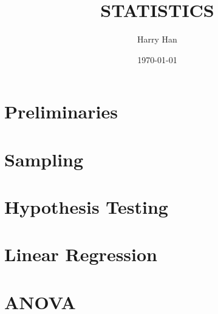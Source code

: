 \documentclass[12pt, a4paper]{report}
\title{
	STATISTICS\\
	\large{}
}
\author{Harry Han}
\date{\today}
\begin{document}
\maketitle
\tableofcontents

\chapter{Preliminaries}


\chapter{Sampling}


\chapter{Hypothesis Testing}


\chapter{Linear Regression}


\chapter{ANOVA}

\end{document}
